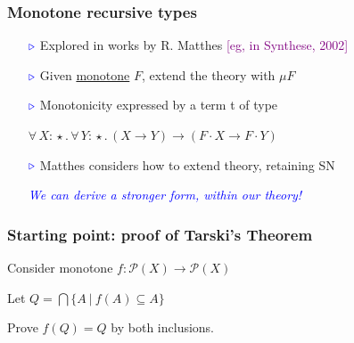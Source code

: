 \documentclass[11pt]{beamer}
\newcommand{\abs}[4]{{#1}\, #2\! : \! #3.\, #4}
\newcommand{\myb}[0]{\ensuremath{\textcolor{blue}{\triangleright}}}
\begin{document}
\begin{frame}
  \frametitle{Monotone recursive types}

  \begin{itemize}
  \item[$\myb$] Explored in works by R. Matthes \textcolor{purple}{[eg, in Synthese, 2002]}

\vspace{.1cm}

  \item[$\myb$] Given \underline{monotone} $F$, extend the theory with $\mu F$

\vspace{.1cm}

  \item[$\myb$] Monotonicity expressed by a term t of type

\vspace{.2cm}

    \hspace{.1cm} $ \abs{\forall}{X}{\star}{\abs{\forall}{Y}{\star}{(X \to Y) \to (F\cdot X \to F\cdot Y)}} $

\vspace{.1cm}

  \item[$\myb$] Matthes considers how to extend theory, retaining SN

    \pause

\vspace{1cm}

{\large
    \textcolor{blue}{\emph{We can derive a stronger form, within our theory!}}
}
  \end{itemize}
 \end{frame}
        
\begin{frame}
  \frametitle{Starting point: proof of Tarski's Theorem}

  Consider monotone $f : \mathcal{P}(X) \to \mathcal{P}(X)$

\vspace{1cm}

  Let $Q = \bigcap\{ A\ |\ f(A) \subseteq A\}$

\vspace{1cm}

  Prove $f(Q) = Q$ by both inclusions.

  \end{frame}
    
\end{document}
